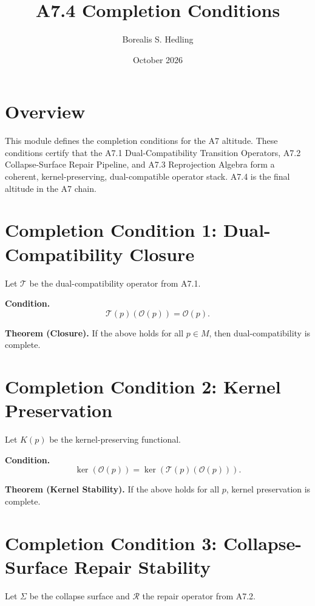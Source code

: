 \documentclass[11pt]{article}
\title{A7.4 Completion Conditions}
\author{Borealis S. Hedling}
\date{October 2026}
\begin{document}
\maketitle

\section*{Overview}

This module defines the completion conditions for the A7 altitude. These
conditions certify that the A7.1 Dual-Compatibility Transition Operators,
A7.2 Collapse-Surface Repair Pipeline, and A7.3 Reprojection Algebra form a
coherent, kernel-preserving, dual-compatible operator stack. A7.4 is the final
altitude in the A7 chain.

\section{Completion Condition 1: Dual-Compatibility Closure}

Let $\mathcal{T}$ be the dual-compatibility operator from A7.1.

\textbf{Condition.}
\[
\mathcal{T}(p)(\mathcal{O}(p)) = \mathcal{O}(p).
\]

\textbf{Theorem (Closure).}
If the above holds for all $p \in M$, then dual-compatibility is complete.

\section{Completion Condition 2: Kernel Preservation}

Let $K(p)$ be the kernel-preserving functional.

\textbf{Condition.}
\[
\ker(\mathcal{O}(p)) = \ker(\mathcal{T}(p)(\mathcal{O}(p))).
\]

\textbf{Theorem (Kernel Stability).}
If the above holds for all $p$, kernel preservation is complete.

\section{Completion Condition 3: Collapse-Surface Repair Stability}

Let $\Sigma$ be the collapse surface and $\mathcal{R}$ the repair operator from
A7.2.
\end{document}
